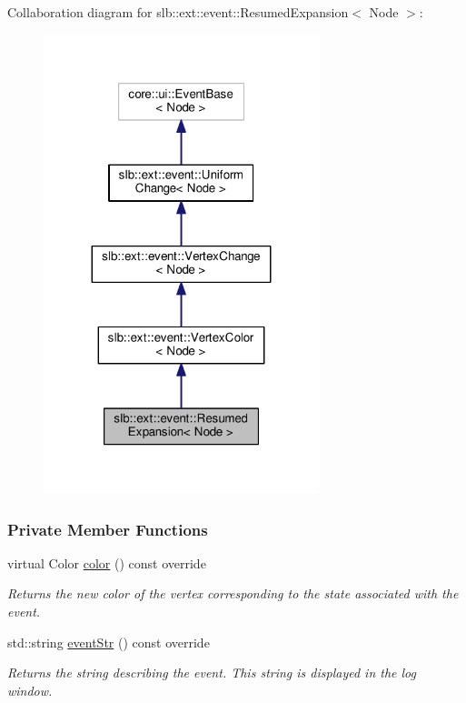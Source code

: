 Collaboration diagram for slb\+:\+:ext\+:\+:event\+:\+:Resumed\+Expansion$<$ Node $>$\+:\nopagebreak
\begin{figure}[H]
\begin{center}
\leavevmode
\includegraphics[width=227pt]{structslb_1_1ext_1_1event_1_1ResumedExpansion__coll__graph}
\end{center}
\end{figure}
\subsubsection*{Private Member Functions}
\begin{DoxyCompactItemize}
\item 
virtual Color \hyperlink{structslb_1_1ext_1_1event_1_1ResumedExpansion_afb9e4dc6fbff2578c6ea9fb2bf15203c}{color} () const override
\begin{DoxyCompactList}\small\item\em Returns the new color of the vertex corresponding to the state associated with the event. \end{DoxyCompactList}\item 
std\+::string \hyperlink{structslb_1_1ext_1_1event_1_1ResumedExpansion_a56df16265e5cdc9b83d60eb652802cda}{event\+Str} () const override
\begin{DoxyCompactList}\small\item\em Returns the string describing the event. This string is displayed in the log window. \end{DoxyCompactList}\end{DoxyCompactItemize}
